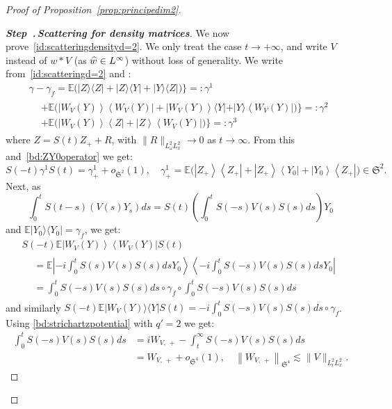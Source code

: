 \documentclass[10pt]{amsart}
\theoremstyle{definition}\newtheorem{defi}[theo]{Definition}\newtheorem{rema}[theo]{Remark}\newtheorem{exam}[theo]{Example}\newtheorem{exem}[theo]{Example}\newtheorem{nota}[theo]{Notation}
\newcommand{\E}{\mathbb{E}}
\newcommand{\frkS}{\mathfrak{S}}
\newcounter{stepcount}
\newenvironment{step}[1]{\refstepcounter{stepcount}\begin{proof}[{\bf{Step~\thestepcount}{.\,\emph{#1}}}]}{\let\qed\relax\end{proof}}
\let\oldhat\hat
\renewcommand*{\hat}[1]{\mathchoice{\widehat{#1}}{\widehat{#1}}{\oldhat{#1}}{\oldhat{#1}}}
\begin{document}
\begin{proof}[{Proof of Proposition~\ref{prop:principedim2}}]
\begin{step}{{Scattering for density matrices}}
We now prove~\eqref{id:scatteringdensityd=2}. We only treat the case $t\rightarrow +\infty$, and write $V$ instead of $w*V$ (as $\hat w\in L^\infty$) without loss of generality. We write from~\eqref{id:scatteringd=2} and :
\begin{multline*}
\gamma-\gamma_f = \E\big(|Z\rangle \langle Z |+|Z\rangle \langle Y|+|Y \rangle \langle Z|\big) \big\}=:\gamma^1\\
\begin{aligned}
&+\E\big(\left|W_{V}(Y)\right\rangle \left\langle W_{V}(Y)\right| +\left|W_{V}(Y)\right\rangle \langle Y|+|Y \rangle \left\langle W_{V}(Y)\right|\big) \big\}=:\gamma^2\\
&+\E\big(\left|W_{V}(Y)\right\rangle \left\langle Z \right|+ \left|Z \right\rangle \left\langle W_{V}(Y)\right|\big)\big\}=:\gamma^3
\end{aligned}
\end{multline*}
where $Z=S(t)Z_++R$, with $\| R \|_{L^2_\omega L^2_x}\rightarrow 0$ as $t\rightarrow \infty$. From this and~\eqref{bd:ZY0operator} we get:
\[
S(-t)\gamma^1S(t)=\gamma^1_+ +o_{\frkS^2}(1), \quad \gamma^1_+=\E\big(\left|Z_+\right\rangle \left\langle Z_+ \right|+\left|Z_+\right\rangle \left\langle Y_0\right|+\left|Y_0 \right\rangle \left\langle Z_+\right|\big)\in \frkS^2.
\]
Next, as 
\[
\int_0^t S(t-s)(V(s)Y_s)ds=S(t)\left(\int_0^t S(-s)V(s)S(s)ds\right)Y_0
\]
and $\E |Y_0\rangle \langle Y_0|=\gamma_f$, we get:
\begin{multline*}
S(-t)\E \left|W_{V}(Y)\right\rangle \left\langle W_{V}(Y)\right|S(t)\\
\begin{aligned}
&=\E \left| -i \int_0^t S(s)V(s)S(s)ds Y_0\right\rangle \left\langle-i \int_0^t S(-s)V(s)S(s)ds Y_0\right|\\
& =\int_0^t S(-s)V(s)S(s)ds \circ \gamma_f \circ \int_0^t S(-s)V(s)S(s)ds
\end{aligned}
\end{multline*}
and similarly $S(-t)\E |W_{V}(Y)\rangle \langle Y|S(t)=-i\int_0^t S(-s)V(s)S(s)ds \circ \gamma_f $. Using \eqref{bd:strichartzpotential} with $q'=2$ we get:
\begin{align*}
\int_0^t S(-s)V(s)S(s)ds &=iW_{V,\,+}-\int_t^\infty S(-s)V(s)S(s)ds \\
&=W_{V,\,+}+o_{\frkS^4}(1), \quad \left\|W_{V,\,+}\right\|_{\frkS^4}\lesssim \| V \|_{L^2_tL^2_x}.
\end{align*}

\end{step}
\end{proof}
\end{document}
